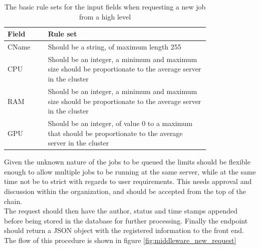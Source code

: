 \documentclass[../main.tex]{subfiles}
\begin{document}
\begin{table}[H]
    \centering
    \begin{tabular}{|l|p{0.8\linewidth}|}
        \hline\textbf{Field} & \textbf{Rule set} \\\hline
        CName & Should be a string, of maximum length 255 \\\hline
        CPU & Should be an integer, a minimum and maximum size should be proportionate to the average server in the cluster \\\hline
        RAM & Should be an integer, a minimum and maximum size should be proportionate to the average server in the cluster \\\hline
        GPU & Should be an integer, of value 0 to a maximum that should be proportionate to the average server in the cluster \\\hline
    \end{tabular}
    \caption{The basic rule sets for the input fields when requesting a new job from a high level}
    \label{tab:basic_ruleset}
\end{table}
Given the unknown nature of the jobs to be queued the limits should be flexible enough to allow multiple jobs to be running at the same server, while at the same time not be to strict with regards to user requirements. This needs approval and discussion within the organization, and should be accepted from the top of the chain.\\
The request should then have the author, status and time stamps appended before being stored in the database for further processing. Finally the endpoint should return a JSON object with the registered information to the front end. The flow of this procedure is shown in figure \ref{fig:middleware_new_request}
\end{document}
